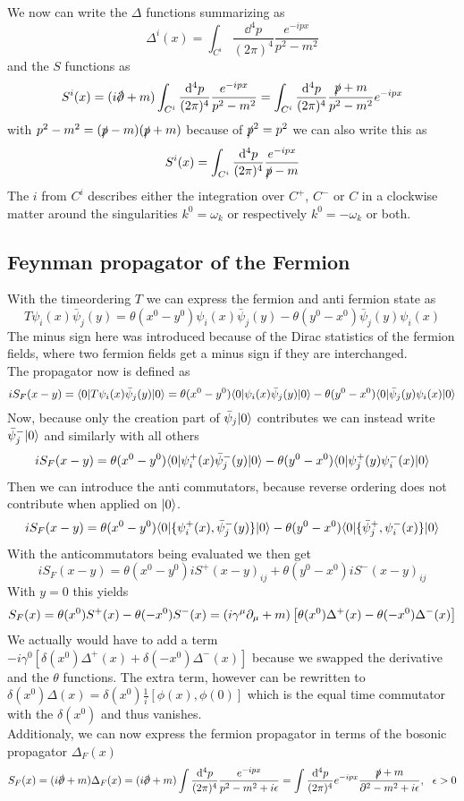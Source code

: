 We now can write the $\Delta$ functions summarizing as
\[ \Delta ^i(x) = \int _{C^i} \frac{\dd ^4 p}{(2\pi)^4} \frac{e^{-ipx}}{p^2-m^2}\]
and the $S$ functions as
\[ S^i(x) = (i \slashed \p +m) \int _{C^i} \frac{\dd ^4 p}{(2\pi)^4} \frac{e^{-ipx}}{p^2-m^2} = \int _{C^i} \frac{\dd ^4 p}{(2\pi)^4} \frac{\slashed p + m}{p^2 - m^2} e^{-ipx}\]
with $p^2-m^2 = (\slashed p - m ) (\slashed p + m)$ because of $\slashed p ^2 = p^2$ we can also write this as
\[ S^i(x) = \int_{C^i} \frac{{\rm d} ^4 p}{(2\pi)^4} \frac{e^{-ipx}}{\slashed p - m}\]
The $i$ from $C^i$ describes either the integration over $C^+$, $C^-$ or $C$ in a clockwise matter around the singularities $k^0 = \omega_k$ or respectively $k^0 = - \omega_k$ or both.

\subsection{Feynman propagator of the Fermion}
With the timeordering $T$ we can express the fermion and anti fermion state as
\[ T \psi_i (x) \bar \psi_j(y) = \theta(x^0 - y^0) \psi_i(x) \bar \psi_j(y) - \theta(y^0 - x^0) \bar \psi_j(y) \psi_i(x) \]
The minus sign here was introduced because of the Dirac statistics of the fermion fields, where two fermion fields get a minus sign if they are interchanged.\\
The propagator now is defined as
\[ i S_F(x-y) = \langle 0 | T \psi_i(x) \bar \psi_j(y) | 0 \rangle = \theta(x^0-y^0) \langle 0 | \psi_i(x) \bar \psi_j(y) | 0 \rangle - \theta(y^0 - x^0) \langle 0 | \bar \psi_j(y) \psi_i(x) | 0 \rangle \]
Now, because only the creation part of $\bar \psi_j | 0 \rangle$ contributes we can instead write $ \bar \psi_j^- | 0 \rangle$ and similarly with all others
\[ i S_F(x-y) = \theta(x^0 - y^0) \langle 0 | \psi_i^+(x) \bar \psi_j^-(y) | 0 \rangle - \theta(y^0 - x^0) \langle 0 | \psi^+_j (y) \psi_i^-(x) | 0 \rangle \]
Then we can introduce the anti commutators, because reverse ordering does not contribute when applied on $ | 0 \rangle$.
\[ i S_F(x-y) = \theta(x^0 - y^0) \langle 0 | \{ \psi_i^+(x), \bar \psi_j^-(y) \} | 0 \rangle - \theta(y^0-x^0) \langle 0 | \{ \bar \psi_j^+, \psi_i^-(x)\} | 0 \rangle\]
With the anticommutators being evaluated we then get
\[ i S_F(x-y) = \theta(x^0 - y^0) i S^+(x-y)_{ij} + \theta(y^0 - x^0) i S^-(x-y)_{ij}\]
With $y = 0$ this yields
\[ S_F(x) = \theta(x^0) S^+(x) - \theta(-x^0) S^-(x) = ( i \gamma^\mu \partial_\mu + m) \left[ \theta (x^0) \Delta^+(x) - \theta(-x^0) \Delta^-(x)\right]\]
We actually would have to add a term $-i \gamma^0 \left[ \delta(x^0) \Delta^+(x) + \delta(-x^0) \Delta^-(x) \right]$ because we swapped the derivative and the $\theta$ functions.
The extra term, however can be rewritten to $\delta(x^0) \Delta(x) = \delta(x^0) \frac{1}{i} [ \phi(x), \phi(0)]$ which is the equal time commutator with the  $\delta(x^0)$ and thus vanishes.\\
Additionaly, we can now express the fermion propagator in terms of the bosonic propagator $\Delta_F(x)$
\[ S_F(x) = ( i \slashed \p + m) \Delta_F(x) = ( i \slashed \p + m) \int \frac{ \dd ^4 p}{(2\pi)^4} \frac{e^{-ipx}}{p^2 - m^2 + i \eps} = \int \frac{\dd ^4 p}{(2\pi)^4} e^{-ipx} \frac{ \slashed p + m}{\p^2 -m^2 + i \eps}, ~~\eps > 0\]

